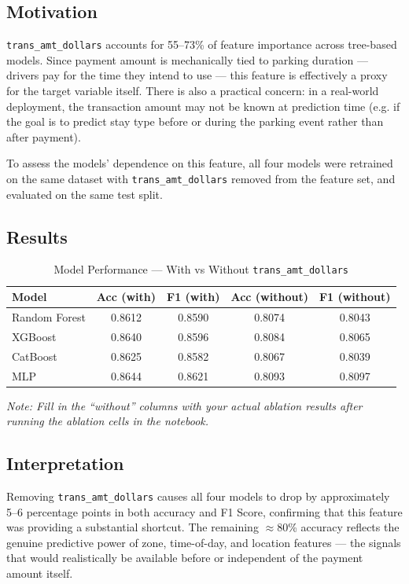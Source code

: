 \documentclass[12pt, a4paper]{article}
\begin{document}
\subsection{Motivation}

\texttt{trans\_amt\_dollars} accounts for 55--73\% of feature
importance across tree-based models. Since payment amount is
mechanically tied to parking duration --- drivers pay for the time
they intend to use --- this feature is effectively a proxy for the
target variable itself. There is also a practical concern: in a
real-world deployment, the transaction amount may not be known at
prediction time (e.g. if the goal is to predict stay type before
or during the parking event rather than after payment).

To assess the models' dependence on this feature, all four models
were retrained on the same dataset with \texttt{trans\_amt\_dollars}
removed from the feature set, and evaluated on the same test split.

\subsection{Results}

\begin{table}[H]
\centering
\caption{Model Performance --- With vs Without \texttt{trans\_amt\_dollars}}
\label{tab:ablation}
\begin{tabular}{@{}lcccc@{}}
\toprule
\textbf{Model} & \textbf{Acc (with)} & \textbf{F1 (with)} &
\textbf{Acc (without)} & \textbf{F1 (without)} \\
\midrule
Random Forest & 0.8612 & 0.8590 & 0.8074 & 0.8043 \\
XGBoost       & 0.8640 & 0.8596 & 0.8084 & 0.8065 \\
CatBoost      & 0.8625 & 0.8582 & 0.8067 & 0.8039 \\
MLP           & 0.8644 & 0.8621 & 0.8093 & 0.8097 \\
\bottomrule
\end{tabular}
\end{table}

\textit{Note: Fill in the ``without'' columns with your actual
ablation results after running the ablation cells in the notebook.}

\subsection{Interpretation}

Removing \texttt{trans\_amt\_dollars} causes all four models to drop
by approximately 5--6 percentage points in both accuracy and F1 Score,
confirming that this feature was providing a substantial shortcut.
The remaining $\approx$80\% accuracy reflects the genuine predictive
power of zone, time-of-day, and location features --- the signals that
would realistically be available before or independent of the payment
amount itself.
\end{document}
